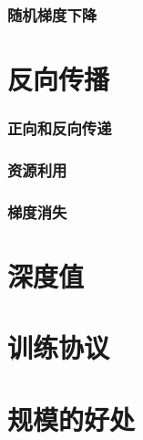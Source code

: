 \subsubsection*{随机梯度下降}

\section{反向传播}

\subsubsection*{正向和反向传递}

\subsubsection*{资源利用}

\subsubsection*{梯度消失}

\section{深度值}\label{sec3.6}

\section{训练协议}\label{sec3.7}

\section{规模的好处}